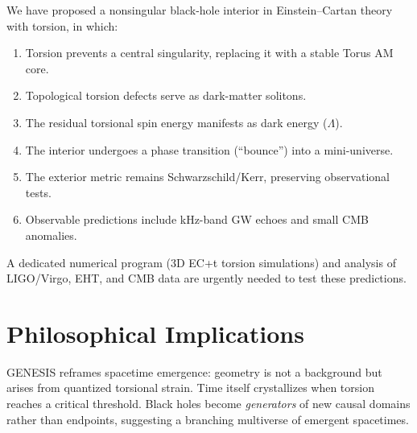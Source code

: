 \documentclass{article}
\begin{document}
We have proposed a nonsingular black-hole interior in Einstein–Cartan theory with torsion, in which:
\begin{enumerate}
  \item Torsion prevents a central singularity, replacing it with a stable Torus AM core.  
  \item Topological torsion defects serve as dark-matter solitons.  
  \item The residual torsional spin energy manifests as dark energy (\(\Lambda\)).  
  \item The interior undergoes a phase transition (“bounce”) into a mini-universe.  
  \item The exterior metric remains Schwarzschild/Kerr, preserving observational tests.  
  \item Observable predictions include kHz-band GW echoes and small CMB anomalies.  
\end{enumerate}
A dedicated numerical program (3D EC+t torsion simulations) and analysis of LIGO/Virgo, EHT, and CMB data are urgently needed to test these predictions.

\section{Philosophical Implications}
\label{sec:philosophy}

GENESIS reframes spacetime emergence: geometry is not a background but arises from quantized torsional strain.  Time itself crystallizes when torsion reaches a critical threshold.  Black holes become \emph{generators} of new causal domains rather than endpoints, suggesting a branching multiverse of emergent spacetimes.
\end{document}
